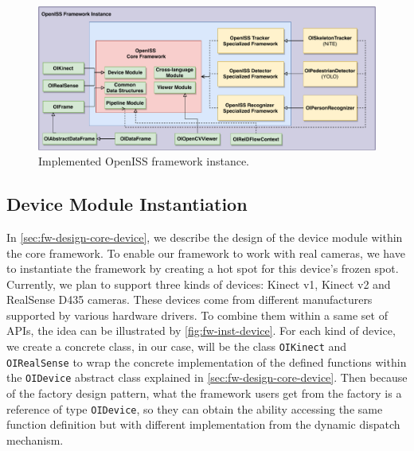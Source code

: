 \begin{figure}
    \includegraphics[width=\linewidth]{figures/framework_inst.pdf}
    \caption{Implemented OpenISS framework instance.}
    \label{fig:fw-inst}
\end{figure}

\subsection{Device Module Instantiation}
\label{sec:fw-inst-device}

In \autoref{sec:fw-design-core-device}, we describe the design of the device
module within the core framework. To enable our framework to work with
real cameras, we have to instantiate the framework by creating a hot spot for this
device's frozen spot.
Currently, we plan to support three kinds of devices: Kinect v1, Kinect v2 and
RealSense D435 cameras. These devices come from different manufacturers
supported by various hardware drivers. To combine them within a same set of
APIs, the idea can be illustrated by \autoref{fig:fw-inst-device}. For each
kind of device, we create a concrete class, in our case, will be the class
\texttt{OIKinect} and \texttt{OIRealSense} to wrap the concrete implementation
of the defined functions within the \texttt{OIDevice} abstract class explained
in \autoref{sec:fw-design-core-device}.
Then because of the factory design pattern, what the framework users get from
the factory is a reference of type \texttt{OIDevice}, so they can obtain the
ability accessing the same function definition but with different implementation
from the dynamic dispatch mechanism.

